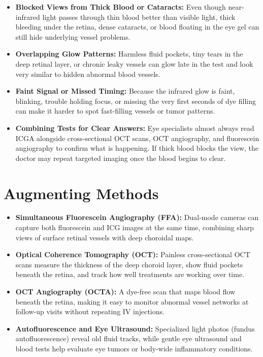 \begin{itemize}
    \item \textbf{Blocked Views from Thick Blood or Cataracts:} Even though near-infrared light passes through thin blood better than visible light, thick bleeding under the retina, dense cataracts, or blood floating in the eye gel can still hide underlying vessel problems.
    \item \textbf{Overlapping Glow Patterns:} Harmless fluid pockets, tiny tears in the deep retinal layer, or chronic leaky vessels can glow late in the test and look very similar to hidden abnormal blood vessels.
    \item \textbf{Faint Signal or Missed Timing:} Because the infrared glow is faint, blinking, trouble holding focus, or missing the very first seconds of dye filling can make it harder to spot fast-filling vessels or tumor patterns.
    \item \textbf{Combining Tests for Clear Answers:} Eye specialists almost always read ICGA alongside cross-sectional OCT scans, OCT angiography, and fluorescein angiography to confirm what is happening. If thick blood blocks the view, the doctor may repeat targeted imaging once the blood begins to clear.
\end{itemize}

\section{Augmenting Methods}

\begin{itemize}
    \item \textbf{Simultaneous Fluorescein Angiography (FFA):} Dual-mode cameras can capture both fluorescein and ICG images at the same time, combining sharp views of surface retinal vessels with deep choroidal maps.
    \item \textbf{Optical Coherence Tomography (OCT):} Painless cross-sectional OCT scans measure the thickness of the deep choroid layer, show fluid pockets beneath the retina, and track how well treatments are working over time.
    \item \textbf{OCT Angiography (OCTA):} A dye-free scan that maps blood flow beneath the retina, making it easy to monitor abnormal vessel networks at follow-up visits without repeating IV injections.
    \item \textbf{Autofluorescence and Eye Ultrasound:} Specialized light photos (fundus autofluorescence) reveal old fluid tracks, while gentle eye ultrasound and blood tests help evaluate eye tumors or body-wide inflammatory conditions.
\end{itemize}

